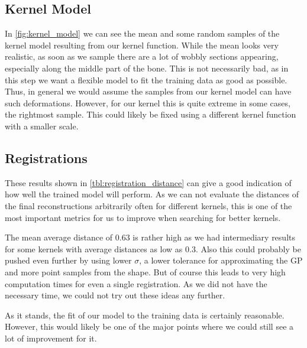 
\subsection{Kernel Model}
\label{subsec:kernmodeldisc}

In \autoref{fig:kernel_model} we can see the mean and some random samples of the kernel model resulting from our kernel function. 
While the mean looks very realistic, as soon as we sample there are a lot of wobbly sections appearing, especially along the middle part of the bone. 
This is not necessarily bad, as in this step we want a flexible model to fit the training data as good as possible.
Thus, in general we would assume the samples from our kernel model can have such deformations.
However, for our kernel this is quite extreme in some cases, \eg the rightmost sample.
This could likely be fixed using a different kernel function with a smaller scale.


\subsection{Registrations}
\label{subsec:registrresultsdisc}
These results shown in \autoref{tbl:registration_distance} can give a good indication of how well the trained model will perform.
As we can not evaluate the distances of the final reconstructions arbitrarily often for different kernels, this is one of the most important metrics for us to improve when searching for better kernels.

The mean average distance of $0.63$ is rather high as we had intermediary results for some kernels with average distances as low as $0.3$. 
Also this could probably be pushed even further by using lower $\sigma$, a lower tolerance for approximating the GP and more point samples from the shape. 
But of course this leads to very high computation times for even a single registration.
As we did not have the necessary time, we could not try out these ideas any further.

As it stands, the fit of our model to the training data is certainly reasonable.
However, this would likely be one of the major points where we could still see a lot of improvement for it.


